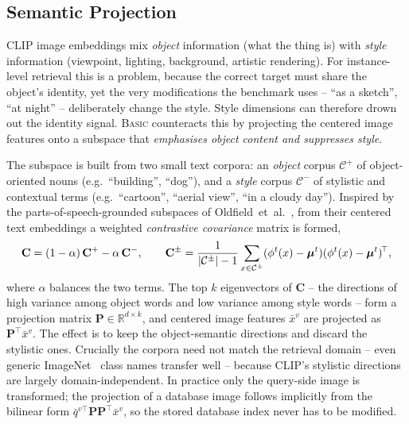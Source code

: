 \subsection{Semantic Projection}\label{sect:rel_basic_proj}

CLIP image embeddings mix \emph{object} information (what the thing is) with
\emph{style} information (viewpoint, lighting, background, artistic rendering). For
instance-level retrieval this is a problem, because the correct target must share
the object's identity, yet the very modifications the benchmark uses -- ``as a
sketch'', ``at night'' -- deliberately change the style. Style dimensions can
therefore drown out the identity signal. \textsc{Basic} counteracts this by
projecting the centered image features onto a subspace that \emph{emphasises
object content and suppresses style}.

The subspace is built from two small text corpora: an \emph{object} corpus
$\mathcal{C}^{+}$ of object-oriented nouns (e.g.\ ``building'', ``dog''), and a
\emph{style} corpus $\mathcal{C}^{-}$ of stylistic and contextual terms (e.g.\
``cartoon'', ``aerial view'', ``in a cloudy day''). Inspired by the
parts-of-speech-grounded subspaces of Oldfield~et~al.~\cite{oldfield2023pos},
from their centered text embeddings a weighted \emph{contrastive covariance}
matrix is formed,
\begin{equation}\label{eq:basic_proj}
  \mathbf{C}
  = (1-\alpha)\,\mathbf{C}^{+} - \alpha\,\mathbf{C}^{-},
  \qquad
  \mathbf{C}^{\pm}
  = \frac{1}{|\mathcal{C}^{\pm}|-1}
    \sum_{x\in\mathcal{C}^{\pm}}
    (\phi^{t}(x)-\bm{\mu}^{t})(\phi^{t}(x)-\bm{\mu}^{t})^{\!\top},
\end{equation}
where $\alpha$ balances the two terms. The top $k$ eigenvectors of $\mathbf{C}$ --
the directions of high variance among object words and low variance among style
words -- form a projection matrix $\mathbf{P}\in\mathbb{R}^{d\times k}$, and
centered image features $\bar{x}^{v}$ are projected as
$\mathbf{P}^{\!\top}\bar{x}^{v}$. The effect is to keep the object-semantic
directions and discard the stylistic ones. Crucially the corpora need not match
the retrieval domain -- even generic ImageNet~\cite{deng2009imagenet} class
names transfer well -- because CLIP's stylistic directions are largely
domain-independent. In practice only the
query-side image is transformed; the projection of a database image follows
implicitly from the bilinear form
$\bar{q}^{v\top}\mathbf{P}\mathbf{P}^{\!\top}\bar{x}^{v}$, so the stored database
index never has to be modified.

